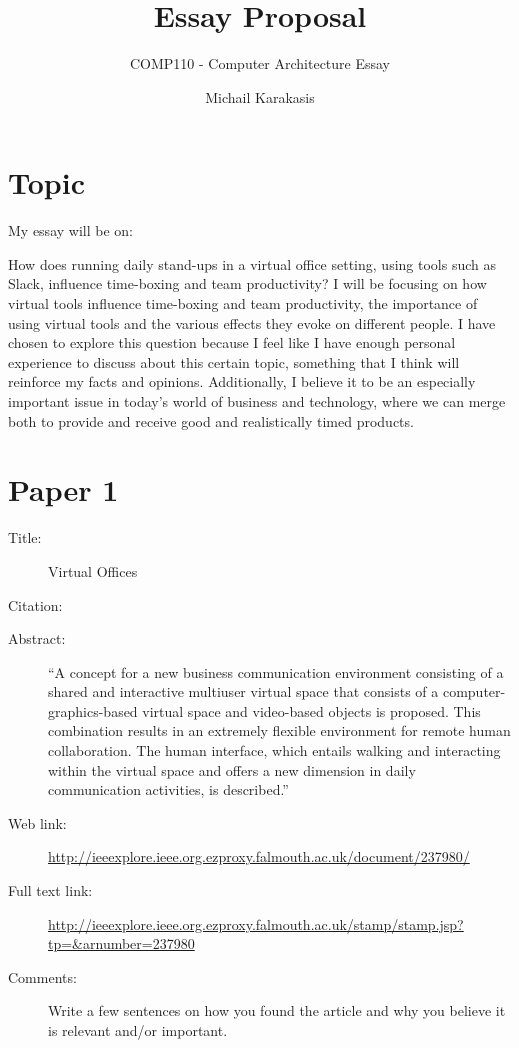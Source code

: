 \documentclass{scrartcl}
\title{Essay Proposal}
\subtitle{COMP110 - Computer Architecture Essay}
\author{Michail Karakasis}
\begin{document}
\maketitle

\section*{Topic}

My essay will be on:

How does running daily stand-ups in a virtual office setting, using tools such as Slack, influence time-boxing and team productivity? I will be focusing on how virtual tools influence time-boxing and team productivity, the importance of using virtual tools and the various effects they evoke on different people. I have chosen to explore this question because I feel like I have enough personal experience to discuss about this certain topic, something that I think will reinforce my facts and opinions. Additionally, I believe it to be an especially important issue in today's world of business and technology, where we can merge both to provide and receive good and realistically timed products.

\section*{Paper 1}
\begin{description}
\item[Title:] Virtual Offices
\item[Citation:] \cite{shannon}
\item[Abstract:] ``A concept for a new business communication environment consisting of a shared and interactive multiuser virtual space that consists of a computer-graphics-based virtual space and video-based objects is proposed. This combination results in an extremely flexible environment for remote human collaboration. The human interface, which entails walking and interacting within the virtual space and offers a new dimension in daily communication activities, is described.''
\item[Web link:] \url{http://ieeexplore.ieee.org.ezproxy.falmouth.ac.uk/document/237980/}
\item[Full text link:] \url{http://ieeexplore.ieee.org.ezproxy.falmouth.ac.uk/stamp/stamp.jsp?tp=&arnumber=237980}
\item[Comments:] Write a few sentences on how you found the article and why you believe it is relevant and/or important.
\end{description}
\end{document}
